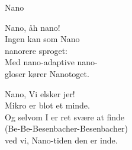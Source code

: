 \begin{song}{Nano}
  \begin{SBVerse}
Nano, åh nano!\\
Ingen kan som Nano\\
nanorere sproget:\\
Med nano-adaptive nano-\\
gloser kører Nanotoget.
  \end{SBVerse}

  \begin{SBChorus}
Nano, Vi elsker jer!\\
Mikro er blot et minde.\\
Og selvom I er ret svære at finde\\
(Be-Be-Besenbacher-Besenbacher)\\
ved vi, Nano-tiden den er inde.
  \end{SBChorus}
\end{song}